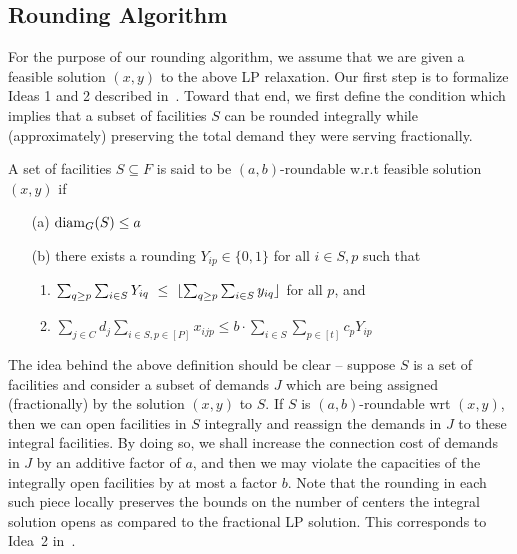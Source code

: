 \subsection{Rounding Algorithm}
For the purpose of our rounding algorithm, we assume that we are given a feasible solution $(x,y)$ to the above LP relaxation. Our first step is to formalize Ideas 1 and 2 described in~. Toward that end, we first define the condition which implies that a subset of facilities $S$ can be rounded integrally while (approximately) preserving the total demand they were serving fractionally.

\begin{definition}\label{def:rnding-mkc}
	A set of facilities $S\subseteq F$ is said to be $(a,b)$-roundable w.r.t feasible solution $(x,y)$ if
	\begin{itemize}%
		\item[(a)] $\mathrm{diam}_G(S) \leq a$
		\item[(b)] there exists a rounding $Y_{ip} \in \{0,1\}$ for all $i \in S, p$ such that
		\begin{enumerate}
			\item $\sum_{q \geq p} \sum_{i\in S} Y_{iq} ~\leq~\lfloor\sum_{q \geq p}\sum_{i\in S} y_{iq}\rfloor$ for all $p$, and
			\item $\sum_{j\in C} d_j \sum_{i\in S,p\in [P]} x_{ijp} \leq b\cdot \sum_{i\in S} \sum_{p\in [t]} c_p Y_{ip}$
		\end{enumerate}
	\end{itemize}
\end{definition}
The idea behind the above definition should be clear -- suppose $S$ is a set of facilities and consider a subset of demands $J$ which are being assigned (fractionally) by
the solution $(x,y)$ to $S$. If $S$ is $(a,b)$-roundable wrt $(x,y)$, then we can open facilities in $S$ integrally and reassign the demands in $J$ to these integral
facilities. By doing so, we shall increase the connection cost of demands in $J$ by an additive factor of $a$, and then we may violate the capacities of the integrally open
facilities by at most a factor $b$. Note that the rounding in each such piece locally preserves the bounds on the number of centers the integral solution opens as compared to the fractional LP solution. This corresponds to Idea~2 in~.


